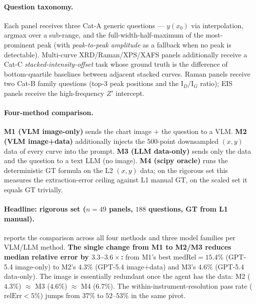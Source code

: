 \documentclass{article}
\begin{document}
\paragraph{Question taxonomy.}
Each panel receives three Cat-A generic questions ---
$y(x_{0})$ via interpolation, argmax over a sub-range, and the
full-width-half-maximum of the most-prominent peak (with
\emph{peak-to-peak amplitude} as a fallback when no peak is
detectable). Multi-curve XRD/Raman/XPS/XAFS panels additionally
receive a Cat-C \emph{stacked-intensity-offset} task whose ground
truth is the difference of bottom-quartile baselines between
adjacent stacked curves. Raman panels receive two Cat-B family
questions (top-3 peak positions and the $\mathrm{I}_{D}/\mathrm{I}_{G}$
ratio); EIS panels receive the high-frequency $Z'$ intercept.

\paragraph{Four-method comparison.}
\textbf{M1 (VLM image-only)} sends the chart image $+$ the question
to a VLM. \textbf{M2 (VLM image+data)} additionally injects the
$500$-point downsampled $(x,y)$ data of every curve into the prompt.
\textbf{M3 (LLM data-only)} sends only the data and the question to
a text LLM (no image). \textbf{M4 (scipy oracle)} runs the
deterministic GT formula on the L2 $(x,y)$ data; on the rigorous set
this measures the extraction-error ceiling against L1 manual GT, on
the scaled set it equals GT trivially.

\paragraph{Headline: rigorous set ($n{=}49$ panels, $188$ questions, GT from L1 manual).}
 reports the comparison across all
four methods and three model families per VLM/LLM method.
\textbf{The single change from M1 to M2/M3 reduces median relative
error by $3.3$–$3.6\times$:} from M1's best $\mathrm{medRel}=15.4\%$
(GPT-5.4 image-only) to M2's $4.3\%$ (GPT-5.4 image$+$data) and M3's
$4.6\%$ (GPT-5.4 data-only). The image is essentially redundant once
the agent has the data: M2 ($4.3\%$) $\approx$ M3 ($4.6\%$)
$\approx$ M4 ($6.7\%$). The within-instrument-resolution pass rate
($\mathrm{relErr}<5\%$) jumps from $37\%$ to $52\text{--}53\%$ in
the same pivot.
\end{document}
